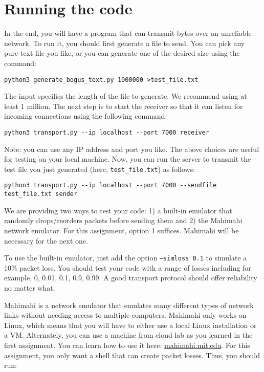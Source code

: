 \documentclass{article}
\begin{document}
\section{Running the code}

In the end, you will have a program that can transmit bytes over an unreliable network. To run it, you should first generate a file to send. You can pick any pure-text file you like, or you can generate one of the desired size using the command:

\begin{verbatim}
python3 generate_bogus_text.py 1000000 >test_file.txt
\end{verbatim}

The input specifies the length of the file to generate. We recommend using at least 1 million. The next step is to start the receiver so that it can listen for incoming connections using the following command:

\begin{verbatim}
python3 transport.py --ip localhost --port 7000 receiver
\end{verbatim}

Note: you can use any IP address and port you like. The above choices are useful for testing on your local machine. Now, you can run the server to transmit the test file you just generated (here, {\tt test\_file.txt}) as follows:

\begin{verbatim}
python3 transport.py --ip localhost --port 7000 --sendfile test_file.txt sender
\end{verbatim}

We are providing two ways to test your code: 1) a built-in emulator that randomly drops/reorders packets before sending them and 2) the Mahimahi network emulator. For this assignment, option 1 suffices. Mahimahi will be necessary for the next one.

To use the built-in emulator, just add the option {\tt --simloss 0.1} to simulate a 10\% packet loss. You should test your code with a range of losses including for example, 0, 0.01, 0.1, 0.9, 0.99. A good transport protocol should offer reliability no matter what.

Mahimahi is a network emulator that emulates many different types of network links without needing access to multiple computers. Mahimahi only works on Linux, which means that you will have to either use a local Linux installation or a VM. Alternately, you can use a machine from cloud lab as you learned in the first assignment. You can learn how to use it here: \href{http://mahimahi.mit.edu}{mahimahi.mit.edu}. For this assignment, you only want a shell that can create packet losses. Thus, you should run:
\end{document}
